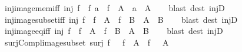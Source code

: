 \begin{isabellebody}
\endisadelimproof
\isanewline
{}\isamarkupfalse%
\ inj{\isacharunderscore}{\kern0pt}image{\isacharunderscore}{\kern0pt}mem{\isacharunderscore}{\kern0pt}iff{\isacharcolon}{\kern0pt}\ {\isachardoublequoteopen}inj\ f\ {\isasymLongrightarrow}\ f\ a\ {\isasymin}\ f\ {\isacharbackquote}{\kern0pt}\ A\ {\isasymlongleftrightarrow}\ a\ {\isasymin}\ A{\isachardoublequoteclose}\isanewline
%
\isadelimproof
\ \ %
\endisadelimproof
%
\isatagproof
{}\isamarkupfalse%
\ {\isacharparenleft}{\kern0pt}blast\ dest{\isacharcolon}{\kern0pt}\ injD{\isacharparenright}{\kern0pt}%
\endisatagproof
{\isafoldproof}%
%
\isadelimproof
\isanewline
%
\endisadelimproof
\isanewline
{}\isamarkupfalse%
\ inj{\isacharunderscore}{\kern0pt}image{\isacharunderscore}{\kern0pt}subset{\isacharunderscore}{\kern0pt}iff{\isacharcolon}{\kern0pt}\ {\isachardoublequoteopen}inj\ f\ {\isasymLongrightarrow}\ f\ {\isacharbackquote}{\kern0pt}\ A\ {\isasymsubseteq}\ f\ {\isacharbackquote}{\kern0pt}\ B\ {\isasymlongleftrightarrow}\ A\ {\isasymsubseteq}\ B{\isachardoublequoteclose}\isanewline
%
\isadelimproof
\ \ %
\endisadelimproof
%
\isatagproof
{}\isamarkupfalse%
\ {\isacharparenleft}{\kern0pt}blast\ dest{\isacharcolon}{\kern0pt}\ injD{\isacharparenright}{\kern0pt}%
\endisatagproof
{\isafoldproof}%
%
\isadelimproof
\isanewline
%
\endisadelimproof
\isanewline
{}\isamarkupfalse%
\ inj{\isacharunderscore}{\kern0pt}image{\isacharunderscore}{\kern0pt}eq{\isacharunderscore}{\kern0pt}iff{\isacharcolon}{\kern0pt}\ {\isachardoublequoteopen}inj\ f\ {\isasymLongrightarrow}\ f\ {\isacharbackquote}{\kern0pt}\ A\ {\isacharequal}{\kern0pt}\ f\ {\isacharbackquote}{\kern0pt}\ B\ {\isasymlongleftrightarrow}\ A\ {\isacharequal}{\kern0pt}\ B{\isachardoublequoteclose}\isanewline
%
\isadelimproof
\ \ %
\endisadelimproof
%
\isatagproof
{}\isamarkupfalse%
\ {\isacharparenleft}{\kern0pt}blast\ dest{\isacharcolon}{\kern0pt}\ injD{\isacharparenright}{\kern0pt}%
\endisatagproof
{\isafoldproof}%
%
\isadelimproof
\isanewline
%
\endisadelimproof
\isanewline
{}\isamarkupfalse%
\ surj{\isacharunderscore}{\kern0pt}Compl{\isacharunderscore}{\kern0pt}image{\isacharunderscore}{\kern0pt}subset{\isacharcolon}{\kern0pt}\ {\isachardoublequoteopen}surj\ f\ {\isasymLongrightarrow}\ {\isacharminus}{\kern0pt}\ {\isacharparenleft}{\kern0pt}f\ {\isacharbackquote}{\kern0pt}\ A{\isacharparenright}{\kern0pt}\ {\isasymsubseteq}\ f\ {\isacharbackquote}{\kern0pt}\ {\isacharparenleft}{\kern0pt}{\isacharminus}{\kern0pt}\ A{\isacharparenright}{\kern0pt}{\isachardoublequoteclose}\isanewline

\end{isabellebody}
